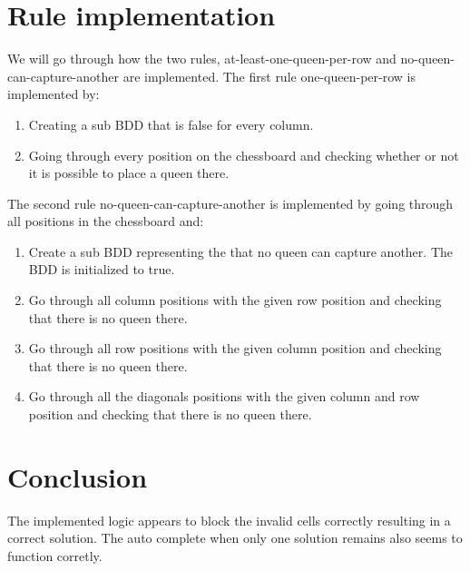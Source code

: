 \section{Rule implementation}
We will go through how the two rules, at-least-one-queen-per-row and no-queen-can-capture-another are implemented. 
The first rule one-queen-per-row is implemented by:
\begin{enumerate}
 \item Creating a sub BDD that is false for every column.
 \item Going through every position on the chessboard and checking whether or not it is possible to place a queen there.
\end{enumerate}

The second rule no-queen-can-capture-another is implemented by going through all positions in the chessboard and:
\begin{enumerate}
	\item Create a sub BDD representing the that no queen can capture another. The BDD is initialized to true.
 	\item Go through all column positions with the given row position and checking that there is no queen there.
 	\item Go through all row positions with the given column position and checking that there is no queen there.
 	\item Go through all the diagonals positions with the given column and row position and checking that there is no queen there.
\end{enumerate}

\section{Conclusion}
The implemented logic appears to block the invalid cells correctly resulting in a correct solution. The auto complete when only one solution remains also seems to function corretly.